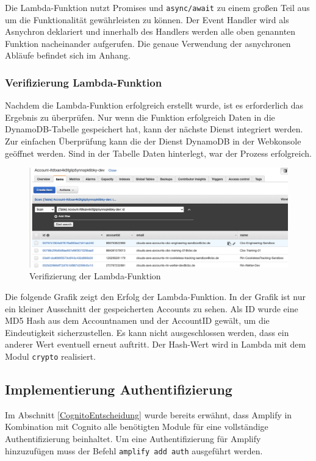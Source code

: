 Die Lambda-Funktion nutzt Promises und \verb+async/await+ zu einem großen Teil aus um die Funktionalität gewährleisten zu können.
Der Event Handler wird als Asnychron deklariert und innerhalb des Handlers werden alle oben genannten Funktion nacheinander aufgerufen.
Die genaue Verwendung der asnychronen Abläufe befindet sich im Anhang.

\subsubsection{Verifizierung Lambda-Funktion}

Nachdem die Lambda-Funktion erfolgreich erstellt wurde, ist es erforderlich das Ergebnis zu überprüfen.
Nur wenn die Funktion erfolgreich Daten in die DynamoDB-Tabelle gespeichert hat, kann der nächste Dienst integriert werden.
Zur einfachen Überprüfung kann die der Dienst DynamoDB in der Webkonsole geöffnet werden.
Sind in der Tabelle Daten hinterlegt, war der Prozess erfolgreich.

\begin{figure}[htbp]
    \centering
    \includegraphics[width=1.0\textwidth]{50-Implementierung/DynamoWeb.png}
    \caption{Verifizierung der Lambda-Funktion}
    \label{fig:meine-grafik}
\end{figure}

Die folgende Grafik zeigt den Erfolg der Lambda-Funktion.
In der Grafik ist nur ein kleiner Ausschnitt der gespeicherten Accounts zu sehen.
Als ID wurde eine MD5 Hash aus dem Accountnamen und der AccountID gewält, um die Eindeutigkeit sicherzustellen.
Es kann nicht ausgeschlossen werden, dass ein anderer Wert eventuell erneut auftritt.
Der Hash-Wert wird in Lambda mit dem Modul \verb+crypto+ realisiert.

\subsection{Implementierung Authentifizierung}

Im Abschnitt \ref{CognitoEntscheidung}  wurde bereits erwähnt, dass Amplify in Kombination mit Cognito
alle benötigten Module für eine vollständige Authentifizierung beinhaltet.
Um eine Authentifizierung für Amplify hinzuzufügen muss der Befehl \verb+amplify add auth+ ausgeführt werden.

